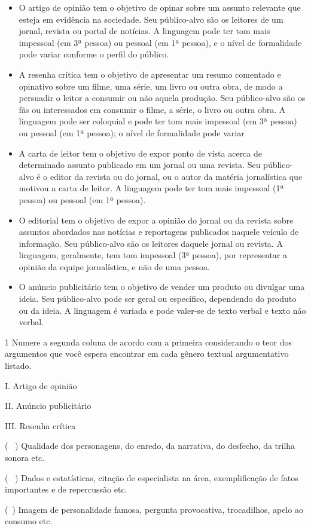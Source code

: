 \begin{itemize}
\tightlist
\item
  O artigo de opinião tem o objetivo de opinar sobre um assunto
  relevante que esteja em evidência na sociedade. Seu público-alvo são
  os leitores de um jornal, revista ou portal de notícias. A linguagem
  pode ter tom mais impessoal (em 3ª pessoa) ou pessoal (em 1ª pessoa),
  e o nível de formalidade pode variar conforme o perfil do público.
\item
  A resenha crítica tem o objetivo de apresentar um resumo comentado e
  opinativo sobre um filme, uma série, um livro ou outra obra, de modo a
  persuadir o leitor a consumir ou não aquela produção. Seu público-alvo
  são os fãs ou interessados em consumir o filme, a série, o livro ou
  outra obra. A linguagem pode ser coloquial e pode ter tom mais
  impessoal (em 3ª pessoa) ou pessoal (em 1ª pessoa); o nível de
  formalidade pode variar
\item
  A carta de leitor tem o objetivo de expor ponto de vista acerca de
  determinado assunto publicado em um jornal ou uma revista. Seu
  público-alvo é o editor da revista ou do jornal, ou o autor da matéria
  jornalística que motivou a carta de leitor. A linguagem pode ter tom
  mais impessoal (1ª pessoa) ou pessoal (em 1ª pessoa).
\item
  O editorial tem o objetivo de expor a opinião do jornal ou da revista
  sobre assuntos abordados nas notícias e reportagens publicados naquele
  veículo de informação. Seu público-alvo são os leitores daquele jornal
  ou revista. A linguagem, geralmente, tem tom impessoal (3ª pessoa),
  por representar a opinião da equipe jornalística, e não de uma pessoa.
\item
  O anúncio publicitário tem o objetivo de vender um produto ou divulgar
  uma ideia. Seu público-alvo pode ser geral ou específico, dependendo
  do produto ou da ideia. A linguagem é variada e pode valer-se de texto
  verbal e texto não verbal.
\end{itemize}


\num{1} Numere a segunda coluna de acordo com a primeira considerando o
teor dos argumentos que você espera encontrar em cada gênero textual
argumentativo listado.

\begin{multicols}{2}
I. Artigo de opinião


II. Anúncio publicitário


III. Resenha crítica 
\columnbreak

(~ ) Qualidade dos personagens, do
enredo, da narrativa, do desfecho, da trilha sonora etc. 

(~ ) Dados e estatísticas, citação de
especialista na área, exemplificação de fatos importantes e de
repercussão etc.

(~) Imagem de
personalidade famosa, pergunta provocativa, trocadilhos, apelo ao
consumo etc.
\end{multicols}

